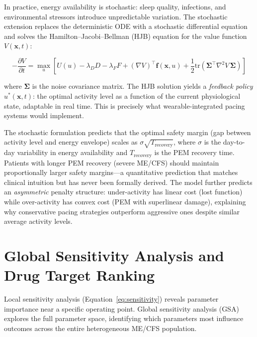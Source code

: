 In practice, energy availability is stochastic: sleep quality, infections, and environmental stressors introduce unpredictable variation. The stochastic extension replaces the deterministic ODE with a stochastic differential equation and solves the Hamilton--Jacobi--Bellman (HJB) equation for the value function $V(\mathbf{x}, t)$:

\begin{equation}
\label{eq:hjb-pacing}
-\frac{\partial V}{\partial t} = \max_{u} \left[ U(u) - \lambda_D D - \lambda_F F + (\nabla V)^\top \mathbf{f}(\mathbf{x}, u) + \frac{1}{2} \text{tr}(\boldsymbol{\Sigma}^\top \nabla^2 V \, \boldsymbol{\Sigma}) \right]
\end{equation}

where $\boldsymbol{\Sigma}$ is the noise covariance matrix. The HJB solution yields a \emph{feedback policy} $u^*(\mathbf{x}, t)$: the optimal activity level as a function of the current physiological state, adaptable in real time. This is precisely what wearable-integrated pacing systems would implement.

\begin{modelunique}
The stochastic formulation predicts that the optimal safety margin (gap between activity level and energy envelope) scales as $\sigma \sqrt{T_{\text{recovery}}}$, where $\sigma$ is the day-to-day variability in energy availability and $T_{\text{recovery}}$ is the PEM recovery time. Patients with longer PEM recovery (severe ME/CFS) should maintain proportionally larger safety margins---a quantitative prediction that matches clinical intuition but has never been formally derived. The model further predicts an \emph{asymmetric} penalty structure: under-activity has linear cost (lost function) while over-activity has convex cost (PEM with superlinear damage), explaining why conservative pacing strategies outperform aggressive ones despite similar average activity levels.
\end{modelunique}

\section{Global Sensitivity Analysis and Drug Target Ranking}
\label{sec:sensitivity-drug-targets}

Local sensitivity analysis (Equation~\ref{eq:sensitivity}) reveals parameter importance near a specific operating point. Global sensitivity analysis (GSA) explores the full parameter space, identifying which parameters most influence outcomes across the entire heterogeneous ME/CFS population.

